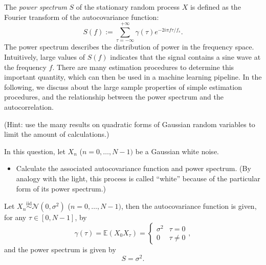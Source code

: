 \documentclass[11pt]{article}
\begin{document}
The \textit{power spectrum} $S$ of the stationary random process $X$ is defined as the Fourier transform of the autocovariance function:
\begin{equation}
    S(f) := \sum_{\tau=-\infty}^{+\infty}\gamma(\tau)e^{-2i\pi f\tau/f_s}.
\end{equation}
The power spectrum describes the distribution of power in the frequency space.
Intuitively, large values of $S(f)$ indicates that the signal contains a sine wave at the frequency $f$.
There are many estimation procedures to determine this important quantity, which can then be used in a machine learning pipeline.
In the following, we discuss about the large sample properties of simple estimation procedures, and the relationship between the power spectrum and the autocorrelation.

(Hint: use the many results on quadratic forms of Gaussian random variables to limit the amount of calculations.)

\begin{exercise}
In this question, let $X_n$ ($n=0,\dots,N-1)$ be a Gaussian white noise.

\begin{itemize}
    \item Calculate the associated autocovariance function and power spectrum. (By analogy with the light, this process is called ``white'' because of the particular form of its power spectrum.)
\end{itemize}

\end{exercise}

\begin{solution}
    Let $X_n \overset{\mathrm{iid}}{\sim} \mathcal{N}(0, \sigma^2)$ ($n=0,\ldots, N-1)$, then the autocovariance function is given, for any $\tau\in [0, N-1]$, by
    \begin{equation}
        \gamma(\tau) = \mathbb{E}(X_0 X_{\tau}) =  \left\{
    \begin{array}{ll}
        \sigma^2 & \tau = 0 \\
        0 & \tau \neq 0
    \end{array},
\right.
    \end{equation}
    and the power spectrum is given by
    \begin{equation}
        S = \sigma^2.
    \end{equation}
\end{solution}
\end{document}
